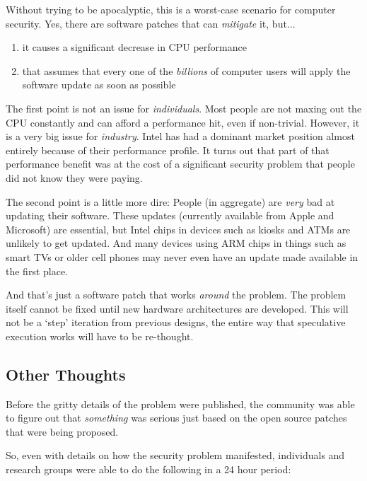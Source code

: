 \documentclass{article}
\begin{document}
Without trying to be apocalyptic, this is a worst-case scenario for computer
security. Yes, there are software patches that can \emph{mitigate} it, but...

\begin{enumerate}
  \item it causes a significant decrease in CPU performance
  \item that assumes that every one of the \emph{billions}
        of computer users will apply the software update as
        soon as possible
\end{enumerate}

The first point is not an issue for \emph{individuals}. Most people are not
maxing out the CPU constantly and can afford a performance hit, even if
non-trivial. However, it is a very big issue for \emph{industry}. Intel has had
a dominant market position almost entirely because of their performance
profile. It turns out that part of that performance benefit was at the cost of
a significant security problem that people did not know they were paying.

The second point is a little more dire: People (in aggregate) are \emph{very}
bad at updating their software. These updates (currently available from Apple
and Microsoft) are essential, but Intel chips in devices such as kiosks and
ATMs are unlikely to get updated. And many devices using ARM chips in things
such as smart TVs or older cell phones may never even have an update made
available in the first place.

And that's just a software patch that works \emph{around} the problem. The
problem itself cannot be fixed until new hardware architectures are developed.
This will not be a `step' iteration from previous designs, the entire way that
speculative execution works will have to be re-thought.

\subsection*{Other Thoughts}

Before the gritty details of the problem were published, the community was able
to figure out that \emph{something} was serious just based on the open source
patches that were being proposed.

So, even with details on how the security problem manifested, individuals and
research groups were able to do the following in a 24 hour period:
\end{document}
